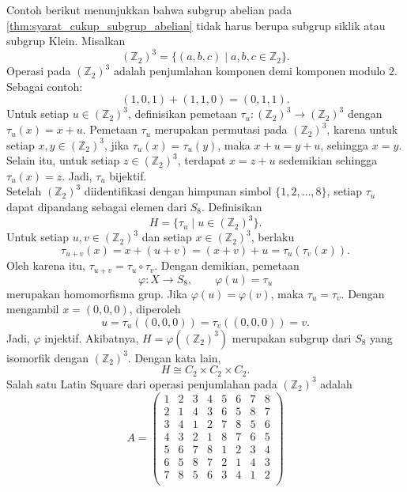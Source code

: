 \begin{contoh}\label{contoh:syarat_cukup_subgrup_abelian_ordo_8}
  Contoh berikut menunjukkan bahwa subgrup abelian pada
  \autoref{thm:syarat_cukup_subgrup_abelian} tidak harus berupa subgrup
  siklik atau subgrup Klein. Misalkan
  \[
    (\mathbb{Z}_2)^3
    =
    \{(a,b,c)\mid a,b,c\in\mathbb{Z}_2\}.
  \]
  Operasi pada $(\mathbb{Z}_2)^3$ adalah penjumlahan komponen demi komponen modulo $2$.
  Sebagai contoh:
  \[
    (1,0,1)+(1,1,0)=(0,1,1).
  \]
  Untuk setiap $u\in (\mathbb{Z}_2)^3$, definisikan pemetaan
  $\tau_u:(\mathbb{Z}_2)^3\to (\mathbb{Z}_2)^3$ dengan $\tau_u(x)=x+u$. Pemetaan $\tau_u$ merupakan
  permutasi pada $(\mathbb{Z}_2)^3$, karena untuk setiap $x,y\in (\mathbb{Z}_2)^3$, jika
  $\tau_u(x)=\tau_u(y)$, maka $x+u=y+u$, sehingga $x=y$. Selain itu,
  untuk setiap $z\in (\mathbb{Z}_2)^3$, terdapat $x=z+u$ sedemikian sehingga
  $\tau_u(x)=z$. Jadi, $\tau_u$ bijektif.\\
  Setelah $(\mathbb{Z}_2)^3$ diidentifikasi dengan himpunan simbol $\{1,2,\ldots,8\}$,
  setiap $\tau_u$ dapat dipandang sebagai elemen dari $S_8$. Definisikan
  \[
    H=\{\tau_u\mid u\in (\mathbb{Z}_2)^3\}.
  \]
  Untuk setiap $u,v\in (\mathbb{Z}_2)^3$ dan setiap $x\in (\mathbb{Z}_2)^3$, berlaku
  \[
    \tau_{u+v}(x)
    =
    x+(u+v)
    =
    (x+v)+u
    =
    \tau_u(\tau_v(x)).
  \]
  Oleh karena itu,
  $
    \tau_{u+v}=\tau_u\circ\tau_v.
  $
  Dengan demikian, pemetaan
  \[
    \varphi:X\to S_8,\qquad \varphi(u)=\tau_u
  \]
  merupakan homomorfisma grup. Jika $\varphi(u)=\varphi(v)$, maka
  $\tau_u=\tau_v$. Dengan mengambil $x=(0,0,0)$, diperoleh
  \[
    u=\tau_u((0,0,0))=\tau_v((0,0,0))=v.
  \]
  Jadi, $\varphi$ injektif. Akibatnya, $H=\varphi((\mathbb{Z}_2)^3)$ merupakan subgrup
  dari $S_8$ yang isomorfik dengan $(\mathbb{Z}_2)^3$. Dengan kata lain,
  \[
    H\cong C_2\times C_2\times C_2.
  \]
  Salah satu Latin Square dari operasi penjumlahan pada $(\mathbb{Z}_2)^3$ adalah
  \[
    A=
    \begin{pmatrix}
      1 & 2 & 3 & 4 & 5 & 6 & 7 & 8 \\
      2 & 1 & 4 & 3 & 6 & 5 & 8 & 7 \\
      3 & 4 & 1 & 2 & 7 & 8 & 5 & 6 \\
      4 & 3 & 2 & 1 & 8 & 7 & 6 & 5 \\
      5 & 6 & 7 & 8 & 1 & 2 & 3 & 4 \\
      6 & 5 & 8 & 7 & 2 & 1 & 4 & 3 \\
      7 & 8 & 5 & 6 & 3 & 4 & 1 & 2 \\

\end{pmatrix}\]
\end{contoh}
